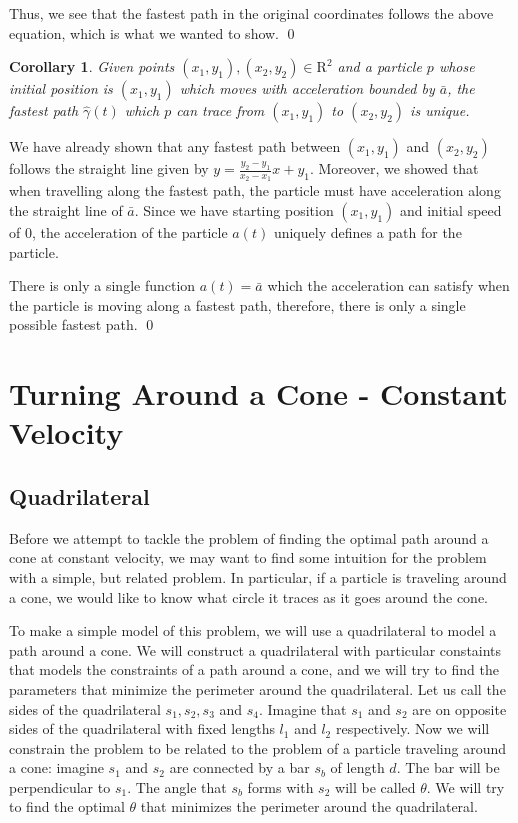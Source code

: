 \documentclass[12pt]{amsart}   %
\newtheorem{corollary}[theorem]{Corollary}
\begin{document}
Thus, we see that the fastest path in the original coordinates follows the above equation, which is what we wanted to show.
\qed

\begin{corollary}
  Given points $(x_1, y_1), (x_2, y_2) \in \mathrm{R}^2$ and a particle $p$ whose initial position is $(x_1, y_1)$ which moves with acceleration bounded by $\bar{a}$, the fastest path $\hat{\gamma}(t)$ which $p$ can trace from $(x_1, y_1)$ to $(x_2, y_2)$ is unique.
\end{corollary}
\proof We have already shown that any fastest path between $(x_1, y_1)$ and $(x_2, y_2)$ follows the straight line given by $y = \frac{y_2 - y_1}{x_2 - x_1} x + y_1$. Moreover, we showed that when travelling along the fastest path, the particle must have acceleration along the straight line of $\bar{a}$. Since we have starting position $(x_1, y_1)$ and initial speed of $0$, the acceleration of the particle $a(t)$ uniquely defines a path for the particle.

There is only a single function $a(t) = \bar{a}$ which the acceleration can satisfy when the particle is moving along a fastest path, therefore, there is only a single possible fastest path.
\qed

\section{Turning Around a Cone - Constant Velocity}

\subsection{Quadrilateral}

Before we attempt to tackle the problem of finding the optimal path around a cone at constant velocity, we may want to find some intuition for the problem with a simple, but related problem. In particular, if a particle is traveling around a cone, we would like to know what circle it traces as it goes around the cone.

To make a simple model of this problem, we will use a quadrilateral to model a path around a cone. We will construct a quadrilateral with particular constaints that models the constraints of a path around a cone, and we will try to find the parameters that minimize the perimeter around the quadrilateral. Let us call the sides of the quadrilateral $s_1, s_2, s_3$ and $s_4$. Imagine that $s_1$ and $s_2$ are on opposite sides of the quadrilateral with fixed lengths $l_1$ and $l_2$ respectively. Now we will constrain the problem to be related to the problem of a particle traveling around a cone: imagine $s_1$ and $s_2$ are connected by a bar $s_b$ of length $d$. The bar will be perpendicular to $s_1$. The angle that $s_b$ forms with $s_2$ will be called $\theta$. We will try to find the optimal $\theta$ that minimizes the perimeter around the quadrilateral.
\begin{figure}
\end{figure}
\end{document}
